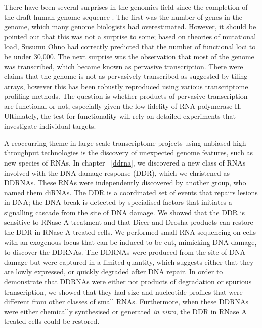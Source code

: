 There have been several surprises in the genomics field since the completion of the draft human genome sequence \cite{lander2001initial,venter2001sequence}. The first was the number of genes in the genome, which many genome biologists had overestimated\cite{genesweep}. However, it should be pointed out that this was not a surprise to some; based on theories of mutational load, Susumu Ohno had correctly predicted that the number of functional loci to be under 30,000\cite{pmid5065367}. The next surprise was the observation that most of the genome was transcribed\cite{pmid11988577, pmid17571346}, which became known as pervasive transcription. There were claims that the genome is not as pervasively transcribed as suggested by tiling arrays\cite{pmid20502517}, however this has been robustly reproduced using various transcriptome profiling methods\cite{pmid22955620}. The question is whether products of pervasive transcription are functional or not, especially given the low fidelity of RNA polymerase II\cite{pmid17277804}. Ultimately, the test for functionality will rely on detailed experiments that investigate individual targets.

A reoccurring theme in large scale transcriptome projects using unbiased high-throughput technologies is the discovery of unexpected genome features, such as new species of RNAs. In chapter ~\ref{ddrna}, we discovered a new class of RNAs involved with the DNA damage response (DDR), which we christened as DDRNAs\cite{francia2012site}. These RNAs were independently discovered by another group, who named them diRNAs\cite{pmid22445173}. The DDR is a coordinated set of events that repairs lesions in DNA; the DNA break is detected by specialised factors that initiates a signalling cascade from the site of DNA damage\cite{pmid19847258}. We showed that the DDR is sensitive to RNase A treatment and that Dicer and Drosha products can restore the DDR in RNase A treated cells. We performed small RNA sequencing on cells with an exogenous locus that can be induced to be cut, mimicking DNA damage, to discover the DDRNAs. The DDRNAs were produced from the site of DNA damage but were captured in a limited quantity, which suggests either that they are lowly expressed, or quickly degraded after DNA repair. In order to demonstrate that DDRNAs were either not products of degradation or spurious transcription, we showed that they had size and nucleotide profiles that were different from other classes of small RNAs. Furthermore, when these DDRNAs were either chemically synthesised or generated \textit{in vitro}, the DDR in RNase A treated cells could be restored.

